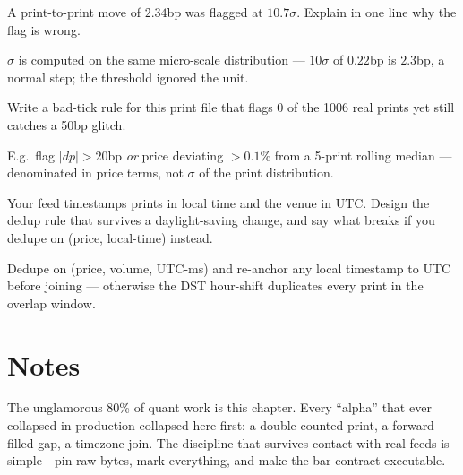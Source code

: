 \begin{exercise}[easy]
A print-to-print move of $2.34$bp was flagged at $10.7\sigma$.
Explain in one line why the flag is wrong.
\end{exercise}
\begin{solution}
$\sigma$ is computed on the same micro-scale distribution ---
$10\sigma$ of $0.22$bp is $2.3$bp, a normal step; the threshold
ignored the unit.
\end{solution}
\begin{exercise}[medium]
Write a bad-tick rule for this print file that flags $0$ of the
1006 real prints yet still catches a 50bp glitch.
\end{exercise}
\begin{solution}
E.g.\ flag $|dp| > 20$bp \emph{or} price deviating $>0.1\%$ from a
5-print rolling median --- denominated in price terms, not
$\sigma$ of the print distribution.
\end{solution}
\begin{exercise}[hard]
Your feed timestamps prints in local time and the venue in UTC.
Design the dedup rule that survives a daylight-saving change, and
say what breaks if you dedupe on (price, local-time) instead.
\end{exercise}
\begin{solution}
Dedupe on (price, volume, UTC-ms) and re-anchor any local
timestamp to UTC before joining --- otherwise the DST hour-shift
duplicates every print in the overlap window.
\end{solution}

\section*{Notes}
The unglamorous 80\% of quant work is this chapter. Every ``alpha'' that ever collapsed in
production collapsed here first: a double-counted print, a forward-filled gap, a timezone
join. The discipline that survives contact with real feeds is simple---pin raw bytes, mark
everything, and make the bar contract executable.

